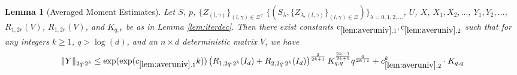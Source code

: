 \documentclass[11pt]{amsart}
\numberwithin{equation}{section}
\numberwithin{equation}{section}
\DeclarePairedDelimiter{\norm}{\lVert}{\rVert}
\newtheorem{lemma}[theorem]{Lemma}
\begin{document}
\begin{lemma}[Averaged Moment Estimates]\label{lem:averuniv}
Let $S$, $p$, $\{Z_{(l,\gamma)}\}_{(l,\gamma) \in \Xi}$, $\{(S_{\lambda},\{Z_{\lambda,(l,\gamma)}\}_{(l,\gamma) \in \Xi})\}_{\lambda=0,1,2,...}$, $U$, $X$, $X_1,X_2,...$, $Y_1,Y_2,...$, $R_{1,2r}(V)$, $R_{1,2r}(V)$, and $K_{q,r}$ be as in Lemma \ref{lem:iterdec}.
Then there exist  constants $c_{\ref{lem:averuniv}.1},c_{\ref{lem:averuniv}.2}$
such that for any integers $k \ge 1$, $q > \log(d)$, and an $n \times d$ deterministic matrix $V$, we have
\begin{equation}\label{eq:averuniv}
    \begin{aligned}
    \norm{Y}_{2q \cdot 2^k} \le \exp(\exp(c_{\ref{lem:averuniv}.1}k))\left(R_{1,2q \cdot 2^k}(I_d)+R_{2,2q \cdot 2^k}(I_d)\right)^{\frac{2}{2k+1}}K_{q,q}^{\frac{2k-1}{2k+1}} q^{\frac{4}{2k+1}}+c_{\ref{lem:averuniv}.2}^k \cdot K_{q,q}
\end{aligned}
\end{equation}


\end{lemma}
\end{document}
